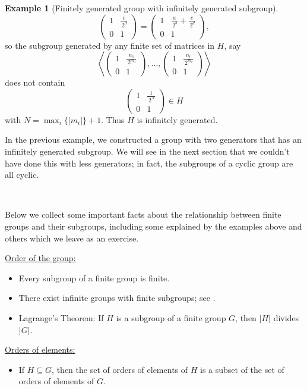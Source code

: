 \documentclass[12pt]{report}
\numberwithin{equation}{section}
\numberwithin{theorem}{chapter}
\theoremstyle{definition}
\newtheorem{example}[theorem]{Example}
\newtheorem*{basic properties}{Basic Properties}
\newtheorem*{Important Remark}{Important Remark}
\begin{document}
\begin{example}[Finitely generated group with infinitely generated subgroup]
$$\begin{pmatrix} 1 & \frac{c}{\, 2^d} \\ 0 & 1 \end{pmatrix} = 
\begin{pmatrix} 1 & \frac{a}{\, 2^b} + \frac{c}{\, 2^d} \\ 0 & 1 \end{pmatrix},$$
so the subgroup generated by any finite set of matrices in $H$, say
$$\left\langle \begin{pmatrix} 1 & \frac{n_1}{\, 2^{m_1}} \\ 0 & 1 \end{pmatrix}, \ldots, \begin{pmatrix} 1 & \frac{n_t}{\, 2^{m_t}} \\ 0 & 1 \end{pmatrix} \right\rangle$$
does not contain
$$\begin{pmatrix} 1 & \frac{1}{\, 2^{N}} \\ 0 & 1 \end{pmatrix} \in H$$
with $N = \max_i \{|m_i| \} + 1$. Thus $H$ is infinitely generated.
\end{example}

In the previous example, we constructed a group with two generators that has an infinitely generated subgroup. We will see in the next section that we couldn't have done this with less generators; in fact, the subgroups of a cyclic group are all cyclic.


\


Below we collect some important facts about the relationship between finite groups and their subgroups, including some explained by the examples above and others which we leave as an exercise.


\vspace{0.5em}

\underline{Order of the group:}
\vspace{-0.3em}
\begin{itemize}[itemsep=-0.2em]
\item Every subgroup of a finite group is finite.
\item There exist infinite groups with finite subgroups; see .
\item Lagrange's Theorem: If $H$ is a subgroup of a finite group $G$, then $|H|$ divides $|G|$.
\end{itemize}

\underline{Orders of elements:}
\vspace{-0.3em}
\begin{itemize}
\item  If $H \subseteq G$, then the set of orders of elements of $H$ is a subset of the set of orders of elements of $G$.
\end{itemize}
\end{document}
